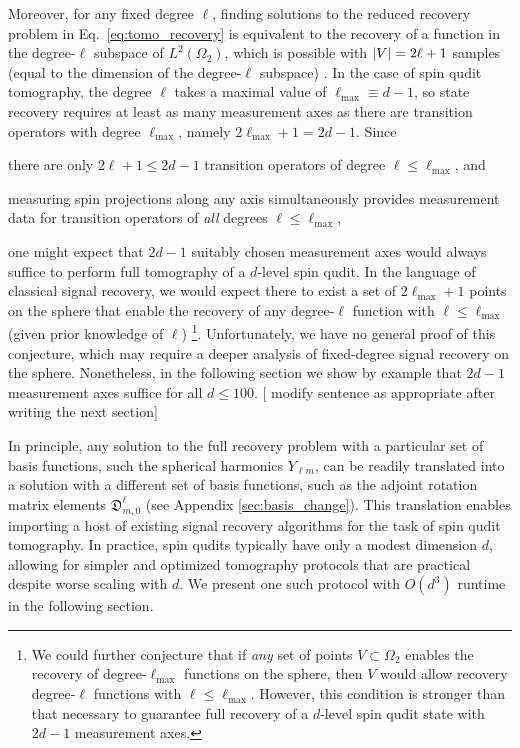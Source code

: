\documentclass[notitlepage,twocolumn]{revtex4-2}
\renewcommand{\t}{\text} %
\newcommand{\p}[1]{\left(#1\right)} %
\newcommand{\1}{\mathds{1}}
\newcommand{\D}{\mathfrak{D}}
\newcommand{\red}[1]{{\color{red} #1}}
\begin{document}
Moreover, for any fixed degree $\ell$, finding solutions to the reduced recovery problem in Eq.~\eqref{eq:tomo_recovery} is equivalent to the recovery of a function in the degree-$\ell$ subspace of $L^2\p{\Omega_2}$, which is possible with $\abs{V}=2\ell+1$ samples (equal to the dimension of the degree-$\ell$ subspace) \cite{freeden2008spherical}.
In the case of spin qudit tomography, the degree $\ell$ takes a maximal value of $\ell_{\t{max}}\equiv d-1$, so state recovery requires at least as many measurement axes as there are transition operators with degree $\ell_{\t{max}}$, namely $2\ell_{\t{max}}+1=2d-1$.
Since
\begin{enumerate*}
\item there are only $2\ell+1\le2d-1$ transition operators of degree $\ell\le\ell_{\t{max}}$, and
\item measuring spin projections along any axis simultaneously provides measurement data for transition operators of {\it all} degrees $\ell\le\ell_{\t{max}}$,
\end{enumerate*}
one might expect that $2d-1$ suitably chosen measurement axes would always suffice to perform full tomography of a $d$-level spin qudit.
In the language of classical signal recovery, we would expect there to exist a set of $2\ell_{\t{max}}+1$ points on the sphere that enable the recovery of any degree-$\ell$ function with $\ell\le\ell_{\t{max}}$ (given prior knowledge of $\ell$) \footnote{We could further conjecture that if {\it any} set of points $V\subset\Omega_2$ enables the recovery of degree-$\ell_{\t{max}}$ functions on the sphere, then $V$ would allow recovery degree-$\ell$ functions with $\ell\le\ell_{\t{max}}$.  However, this condition is stronger than that necessary to guarantee full recovery of a $d$-level spin qudit state with $2d-1$ measurement axes.}.
Unfortunately, we have no general proof of this conjecture, which may require a deeper analysis of fixed-degree signal recovery on the sphere.
Nonetheless, in the following section we show by example that $2d-1$ measurement axes suffice for all $d\le100$. [\red{modify sentence as appropriate after writing the next section}]

In principle, any solution to the full recovery problem with a particular set of basis functions, such the spherical harmonics $Y_{\ell m}$, can be readily translated into a solution with a different set of basis functions, such as the adjoint rotation matrix elements $\D^\ell_{m,0}$ (see Appendix \ref{sec:basis_change}).
This translation enables importing a host of existing signal recovery algorithms \cite{mcewen2011novel, mcewen2011sampling, rauhut2011sparse, alem2012sparse, khalid2014optimaldimensionality} for the task of spin qudit tomography.
In practice, spin qudits typically have only a modest dimension $d$, allowing for simpler and optimized tomography protocols that are practical despite worse scaling with $d$.
We present one such protocol with $O\p{d^3}$ runtime in the following section.
\end{document}
